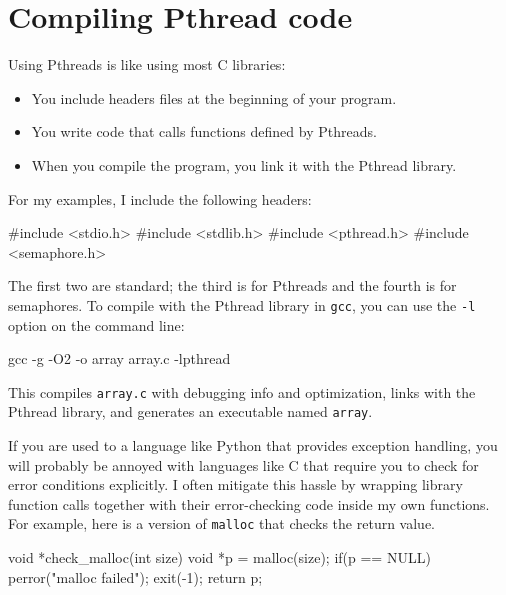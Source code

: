 \documentclass{book}
\begin{document}
\section{Compiling Pthread code}

Using Pthreads is like using most C libraries:

\begin{itemize}

    \item You include headers files at the beginning of your
          program.

    \item You write code that calls functions defined by Pthreads.

    \item When you compile the program, you link it with the
          Pthread library.

\end{itemize}

For my examples, I include the following headers:

\begin{unbreakable}[title={Headers}]{}
#include <stdio.h>
#include <stdlib.h>
#include <pthread.h>
#include <semaphore.h>
\end{unbreakable}

The first two are standard; the third is for Pthreads and
the fourth is for semaphores.
To compile with the Pthread library in {\tt gcc}, you
can use the {\tt -l}
option on the command line:

\begin{unbreakable}[]{}
gcc -g -O2 -o array array.c -lpthread
\end{unbreakable}

This compiles {\tt array.c} with debugging info and optimization,
links with the Pthread library, and generates an executable
named {\tt array}.

If you are used to a language like Python that provides exception
handling, you will probably be annoyed with languages like C that
require you to check for error conditions explicitly.  I often
mitigate this hassle by wrapping library function calls
together with their error-checking code inside my own functions.
For example, here is a version of {\tt malloc}
that checks the return value.

\begin{unbreakable}[]{}
void *check_malloc(int size) {
  void *p = malloc(size);
  if(p == NULL) {
    perror("malloc failed");
    exit(-1);
  }
  return p;
}
\end{unbreakable}
\end{document}
